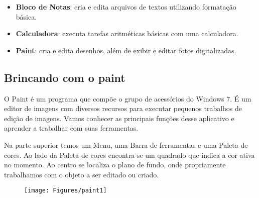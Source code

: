 \documentclass[hidelinks,12pt]{article}
\begin{document}
			
			\begin{itemize}
				\item{
					{\bf Bloco de Notas}: cria e edita arquivos de textos utilizando formatação básica.
					}
				
				\item{
					{\bf Calculadora}: executa tarefas aritméticas básicas com uma calculadora.
					}
					
				\item{
					{\bf Paint}: cria e edita desenhos, além de exibir e editar fotos digitalizadas.
					}
			\end{itemize}
			
			\subsection{Brincando com o paint}
			
			O Paint é um programa que compõe o grupo de acessórios do Windows 7. É um editor de imagens com diversos recursos para executar pequenos trabalhos de edição de imagens. Vamos conhecer as principais funções desse aplicativo e aprender a trabalhar com suas ferramentas.
			
			Na parte superior temos um Menu, uma Barra de ferramentas e uma Paleta de cores. Ao lado da Paleta de cores encontra-se um quadrado que indica a cor ativa no momento. Ao centro se localiza o plano de fundo, onde propriamente trabalhamos com o objeto a ser editado ou criado.
			
			\begin{figure}[!h]
				\centering
				\texttt{[image: Figures/paint1]}
				\label{fig:paint1}
			\end{figure}
		
\end{document}
